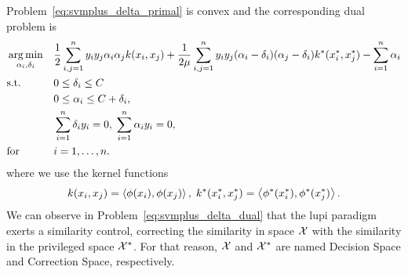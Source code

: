Problem~\eqref{eq:svmplus_delta_primal} is convex and the corresponding dual problem is
\begin{equation}\label{eq:svmplus_delta_dual}
    \begin{aligned}
        & \argmin_{\alpha_i, \delta_i} 
        & & \frac{1}{2} \sum_{i, j=1}^\nsamples y_i y_j \alpha_i \alpha_j k(x_i, x_j) +\frac{1}{2 \mu} \sum_{i, j=1}^\nsamples y_i y_j (\alpha_i - \delta_i) (\alpha_j - \delta_i) k^*(x^*_i, x^*_j)  - \sum_{i=1}^\nsamples \alpha_i \\
        & \text{s.t.}
        & & 0 \leq \delta_i \leq C \\
        & & & 0 \leq \alpha_i \leq C + \delta_i, \\
        & & & \sum_{i=1}^{\nsamples}{\delta_i y_i} = 0, \; 
        \sum_{i=1}^{\nsamples}{\alpha_i y_i} = 0, \\
        & \text{for } & & i=1, \ldots, \nsamples.
        \end{aligned}
\end{equation}
where we use the kernel functions
$$k(x_i, x_j) = \left\langle \phi(x_i), \phi(x_j) \right\rangle, \; k^*(x^*_i, x^*_j) = \left\langle \phi^*(x^*_i), \phi^*(x^*_j) \right\rangle.$$ 
We can observe in Problem~\eqref{eq:svmplus_delta_dual} that the \acrshort{lupi} paradigm exerts a similarity control, correcting the similarity in space $\mathcal{X}$ with the similarity in the privileged space $\mathcal{X}^*$. For that reason, $\mathcal{X}$ and $\mathcal{X}^*$ are named Decision Space and Correction Space, respectively.


